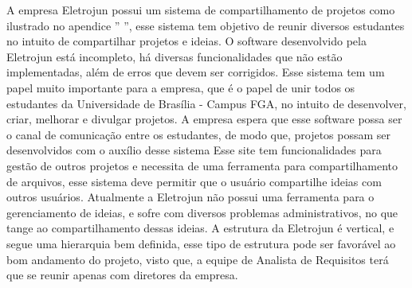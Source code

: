 A empresa Eletrojun possui um sistema de compartilhamento de projetos como ilustrado no apendice '' ”, esse sistema tem objetivo de reunir diversos estudantes no intuito de compartilhar projetos e ideias.
O software desenvolvido pela Eletrojun está incompleto, há diversas funcionalidades que não estão implementadas, além de erros que devem ser corrigidos. Esse sistema tem um papel muito importante para a empresa, que é o papel de unir todos os estudantes da Universidade de Brasília - Campus FGA, no intuito de desenvolver, criar, melhorar e divulgar projetos. A empresa espera que esse software possa ser o canal de comunicação entre os estudantes, de modo que, projetos possam ser desenvolvidos com o auxílio desse sistema
Esse site tem funcionalidades para gestão de outros projetos e necessita de uma ferramenta para compartilhamento de arquivos, esse sistema deve permitir que o usuário compartilhe ideias com outros usuários.
Atualmente a Eletrojun não possui uma ferramenta para o gerenciamento de ideias, e sofre com diversos problemas administrativos, no que tange ao
compartilhamento dessas ideias.
A estrutura da Eletrojun é vertical, e segue uma hierarquia bem definida, esse tipo de estrutura pode ser favorável ao bom andamento do projeto, visto que, a equipe de Analista de Requisitos terá que se reunir apenas com diretores da empresa.
